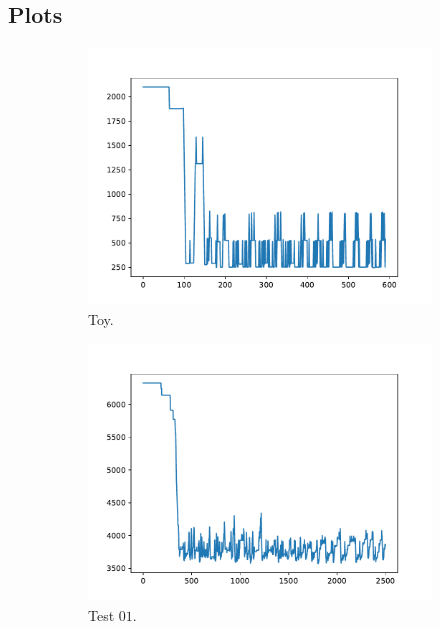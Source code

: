 \subsection{Plots}
\begin{figure}[h!]
    \centering
    \begin{subfigure}{0.35
            \textwidth}
        \includegraphics[width=\textwidth]{../logs/toy.pdf}
        \caption{Toy.}
    \end{subfigure}
    \begin{subfigure}{0.35
            \textwidth}
        \includegraphics[width=\textwidth]{../logs/test01.pdf}
        \caption{Test $01$.}
    \end{subfigure}
    \begin{subfigure}{0.35
            \textwidth}

\end{subfigure}
\end{figure}
